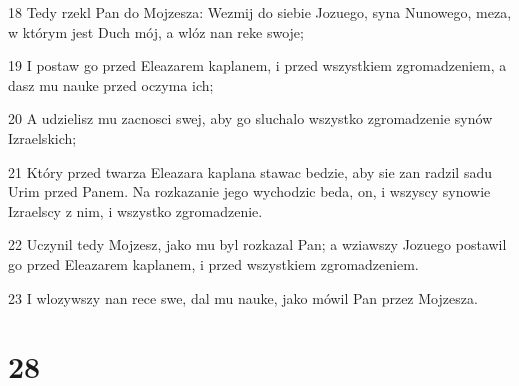\par 18 Tedy rzekl Pan do Mojzesza: Wezmij do siebie Jozuego, syna Nunowego, meza, w którym jest Duch mój, a wlóz nan reke swoje;
\par 19 I postaw go przed Eleazarem kaplanem, i przed wszystkiem zgromadzeniem, a dasz mu nauke przed oczyma ich;
\par 20 A udzielisz mu zacnosci swej, aby go sluchalo wszystko zgromadzenie synów Izraelskich;
\par 21 Który przed twarza Eleazara kaplana stawac bedzie, aby sie zan radzil sadu Urim przed Panem. Na rozkazanie jego wychodzic beda, on, i wszyscy synowie Izraelscy z nim, i wszystko zgromadzenie.
\par 22 Uczynil tedy Mojzesz, jako mu byl rozkazal Pan; a wziawszy Jozuego postawil go przed Eleazarem kaplanem, i przed wszystkiem zgromadzeniem.
\par 23 I wlozywszy nan rece swe, dal mu nauke, jako mówil Pan przez Mojzesza.

\chapter{28}

